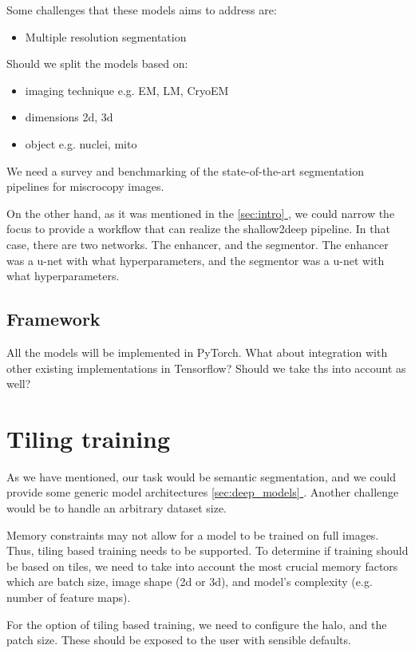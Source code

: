 \documentclass[12pt, a4paper]{article}
\newcommand*{\fullref}[1]{\hyperref[{#1}]{\ref*{#1} \nameref*{#1}}}
\begin{document}
Some challenges that these models aims to address are:
\begin{itemize}
    \item Multiple resolution segmentation
\end{itemize}

Should we split the models based on:
\begin{itemize}
    \item imaging technique e.g. EM, LM, CryoEM
    \item dimensions 2d, 3d
    \item object e.g. nuclei, mito
\end{itemize}

We need a survey and benchmarking of the state-of-the-art segmentation pipelines for miscrocopy images.

On the other hand, as it was mentioned in the \fullref{sec:intro}, we could narrow the focus to provide a workflow that can realize the shallow2deep pipeline. In that case, there are two networks. The enhancer, and the segmentor. The enhancer was a u-net with what hyperparameters, and the segmentor was a u-net with what hyperparameters.

\subsection{Framework}

All the models will be implemented in PyTorch. What about integration with other existing implementations in Tensorflow? Should we take ths into account as well?

\section{Tiling training}
\label{sec:tiling}

As we have mentioned, our task would be semantic segmentation, and we could provide some generic model architectures \fullref{sec:deep_models}. Another challenge would be to handle an arbitrary dataset size.

Memory constraints may not allow for a model to be trained on full images. Thus, tiling based training needs to be supported. To determine if training should be based on tiles, we need to take into account the most crucial memory factors which are batch size, image shape (2d or 3d), and model's complexity (e.g. number of feature maps).

For the option of tiling based training, we need to configure the halo, and the patch size. These should be exposed to the user with sensible defaults.
\end{document}
